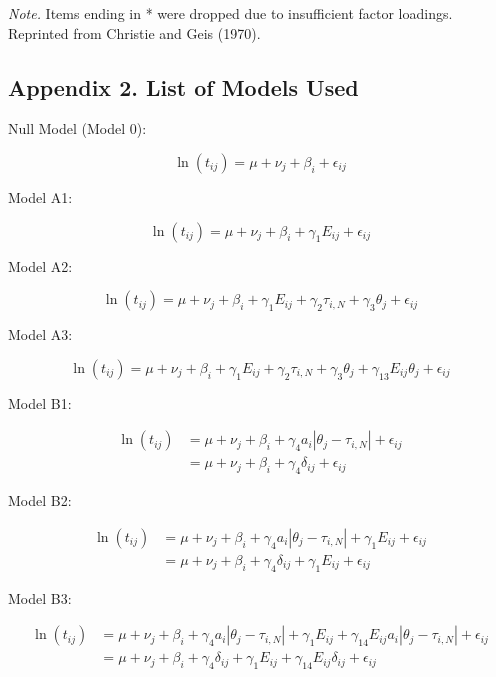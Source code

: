 \documentclass[
  number]{elsarticle}
\begin{document}
\emph{Note.} Items ending in * were dropped due to insufficient factor
loadings. Reprinted from Christie and Geis (1970).

\subsection*{Appendix 2. List of Models
Used}\label{appendix-2.-list-of-models-used}

Null Model (Model 0):

\[
\ln{(t_{ij})} = \mu + \nu_j + \beta_i + \epsilon_{ij}
\]

Model A1:

\[
\ln{(t_{ij})} = \mu + \nu_j + \beta_i + \gamma_1 E_{ij} + \epsilon_{ij}
\]

Model A2:

\[
\ln{(t_{ij})} = \mu + \nu_j + \beta_i + \gamma_1 E_{ij} + \gamma_2\tau_{i,N} + \gamma_3 \theta_j + \epsilon_{ij}
\]

Model A3:

\[
\ln{(t_{ij})} = \mu + \nu_j + \beta_i + \gamma_1 E_{ij} + \gamma_2\tau_{i,N} + \gamma_3 \theta_j + \gamma_{13} E_{ij} \theta_j+ \epsilon_{ij}
\]

Model B1:

\begin{align}
\ln{(t_{ij})} &= \mu + \nu_j + \beta_i + \gamma_4 a_i |\theta_j - \tau_{i,N}|+ \epsilon_{ij} \\
&=\mu + \nu_j +\beta_i +\gamma_4\delta_{ij}+\epsilon_{ij}
\end{align}

Model B2:

\begin{align}
\ln{(t_{ij})} &= \mu + \nu_j + \beta_i + \gamma_4 a_i |\theta_j - \tau_{i,N}|+ \gamma_1E_{ij}+\epsilon_{ij} \\
&=\mu + \nu_j +\beta_i +\gamma_4\delta_{ij}+\gamma_1 E_{ij}+\epsilon_{ij}
\end{align}

Model B3:

\begin{align}
\ln{(t_{ij})} &= \mu + \nu_j + \beta_i + \gamma_4 a_i |\theta_j - \tau_{i,N}|+ \gamma_1E_{ij}+\gamma_{14}E_{ij}a_i|\theta_j-\tau_{i,N}|+\epsilon_{ij} \\
&=\mu + \nu_j +\beta_i +\gamma_4\delta_{ij}+\gamma_1 E_{ij}+\gamma_{14}E_{ij}\delta_{ij}+\epsilon_{ij}
\end{align}


\nocite{*}
\end{document}
